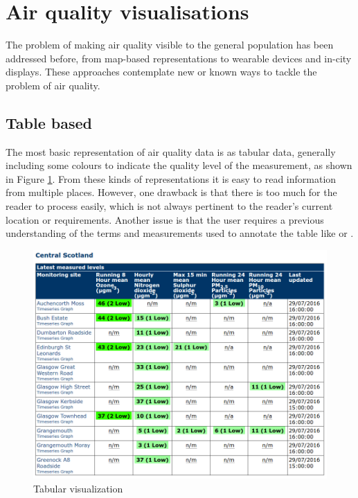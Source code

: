 \section{Air quality visualisations}
The problem of making air quality visible to the general population has been addressed before, from map-based representations to wearable devices and in-city displays. These approaches contemplate new or known ways to tackle the problem of air quality.

\subsection{Table based}
The most basic representation of air quality data is as tabular data, generally including some colours to indicate the quality level of the measurement, as shown in Figure \ref{fig:table_based_visualization}. From these kinds of representations it is easy to read information from multiple places. However, one drawback is that there is too much for the reader to process easily, which is not always pertinent to the reader's current location or requirements. Another issue is that the user requires a previous understanding of the terms and measurements used to annotate the table like  or . 

\begin{figure}[H]
\begin{adjustbox}{width=1\textwidth,center=\textwidth}
  \centering
  \includegraphics[scale=1]{images/tabular_data.png}
\end{adjustbox}
  \caption[Tabular visualization]{Tabular visualization \cite{DepartmentforEnvironment}}
  \label{fig:table_based_visualization}
\end{figure}


